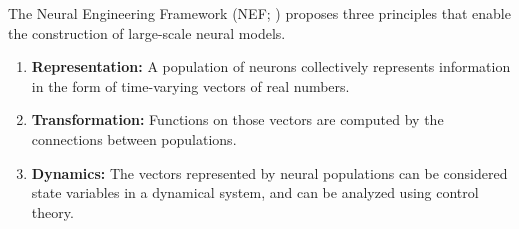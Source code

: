\documentclass{frontiersSCNS}
\begin{document}
The Neural Engineering Framework (NEF; \cite{TODO})
proposes three principles
that enable the construction
of large-scale neural models.

\begin{enumerate}
  \item \textbf{Representation:} A population of neurons
    collectively represents information in the form of
    time-varying vectors of real numbers.
  \item \textbf{Transformation:} Functions on those vectors
    are computed by the connections between populations.
  \item \textbf{Dynamics:} The vectors represented
    by neural populations can be considered state variables
    in a dynamical system, and can be analyzed using control theory.
\end{enumerate}
\end{document}
